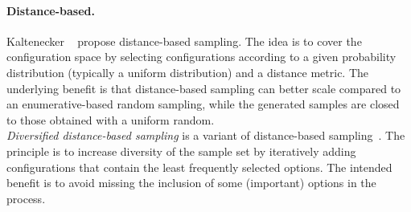 \paragraph{Distance-based.} Kaltenecker \etal~\cite{kaltenecker2019} propose distance-based sampling.  
The idea is to cover the configuration
space by selecting configurations according to a given probability
distribution (typically a uniform distribution) and a distance metric. 
The underlying benefit is that distance-based sampling can better scale compared to an enumerative-based random sampling, while the generated samples are closed to those obtained with a uniform random. \\[-5pt]

\textit{Diversified distance-based sampling} is a variant of distance-based sampling~\cite{kaltenecker2019}. The principle is to increase diversity
of the sample set by iteratively adding configurations that contain the least frequently selected options. The intended benefit is to avoid missing the inclusion of some (important) options in the process. 

